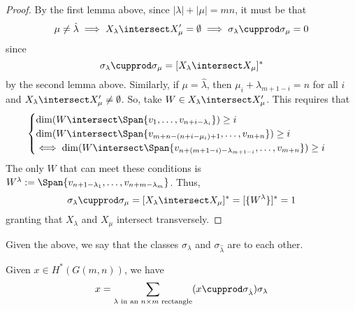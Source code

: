 \documentclass[11pt,leqno,oneside]{amsart}
\numberwithin{thm}{section}
\begin{document}
\begin{proof}
  By the first lemma above, since \(|\lambda|+|\mu| = mn\), it must be
  that \[
    \mu \neq \hat{\lambda} \implies X_\lambda \intersect X_\mu' =
    \emptyset \implies \sigma_\lambda \cupprod \sigma_\mu = 0
  \]
  since \[
    \sigma_\lambda \cupprod \sigma_\mu = [X_\lambda \intersect X_\mu]^*
  \]
  by the second lemma above. Similarly, if \(\mu = \hat{\lambda}\),
  then \(\mu_i + \lambda_{m+1-i} = n\) for all \(i\) and \(X_\lambda
  \intersect X_\mu' \neq \emptyset\). So, take \(W \in X_\lambda
  \intersect X_\mu'\). This requires that  \[
    \begin{cases}
      \dim(W \intersect \Span\{v_1, \ldots, v_{n+i-\lambda_i}\}) \geq i \\
      \dim(W \intersect \Span\{v_{m+n-(n+i-\mu_i)+1}, \ldots,
      v_{m+n}\}) \geq i \\
      \iff \dim(W \intersect
      \Span\{v_{n+(m+1-i)-\lambda_{m+1-i}}, \ldots, v_{m+n}\}) \geq i
    \end{cases}
  \]
  The only \(W\) that can meet these conditions is \(W^\lambda :=
  \Span\{v_{n+1-\lambda_1}, \ldots, v_{n+m-\lambda_m}\}\). Thus, \[
    \sigma_\lambda \cupprod \sigma_\mu = [X_\lambda \intersect
    X_\mu]^* = [\{W^\lambda\}]^* = 1
  \]
  granting that \(X_\lambda\) and \(X_\mu\) intersect
  transversely.  
\end{proof}
\begin{defn}
  Given the above, we say that the classes \(\sigma_{\lambda}\) and
  \(\sigma_{\hat{\lambda}}\) are  to each other.
\end{defn}
\begin{cor}
  Given \(x \in H^*(G(m,n))\), we have \[
    x = \sum_{\lambda \text{ in an }n \times m\text{ rectangle}} (x
    \cupprod \sigma_{\hat{\lambda}}) \sigma_\lambda
  \]
\end{cor}
\end{document}
